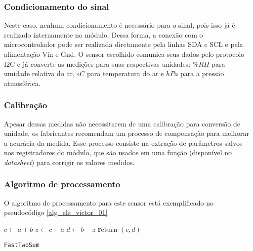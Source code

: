 		\subsubsection{Condicionamento do sinal}

		Neste caso, nenhum condicionamento é necessário para o sinal, pois isso já é realizado internamente no módulo. Dessa forma, a conexão com o microcontrolador pode ser realizada diretamente pela linhas SDA e SCL e pela alimentação Vin e Gnd. O sensor escolhido comunica seus dados pelo protocolo I2C e já converte as medições para suas respectivas unidades: $\% RH$ para umidade relativa do ar,  $\circ C$ para temperatura do ar e $hPa$ para a pressão atmosférica. 

		\subsubsection{Calibração}

		Apesar dessas medidas não necessitarem de uma calibração para conversão de unidade, os fabricantes recomendam um processo de compensação para melhorar a acurácia da medida. Esse processo consiste na extração de parâmetros salvos nos registradores do módulo, que são usados em uma função (disponível no \emph{datasheet}) para corrigir os valores medidos.

		\subsubsection{Algoritmo de processamento}

		O algoritmo de processamento para este sensor está exemplificado no pseudocódigo \ref{alg_ele_victor_01}

		\begin{center}
			\begin{minipage}{0.5\linewidth} %
				\begin{algorithm}[H]
					\label{alg_ele_victor_01}
					\medskip
					$c \leftarrow a + b$ \;
					$z \leftarrow c - a$ \;
					$d \leftarrow b - z$ \;
					{\textbf return} $(c,d)$ \;
					\caption{\texttt{FastTwoSum}} %
					\label{alg:fastTwoSum}   %
				\end{algorithm}
			\end{minipage}
		\end{center}

